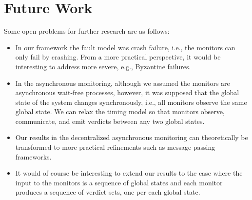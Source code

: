 \section{Future Work}

Some open problems for further research are as follows:

\begin{itemize}

\item In our framework the fault model was crash failure, i.e., the monitors can only fail by crashing. From a more practical perspective, it would be interesting to address more severe, e.g., Byzantine failures.

\item In the asynchronous monitoring, although we assumed the monitors are 
asynchronous wait-free processes, however, it was supposed that the global state 
of the system changes synchronously, i.e., all monitors observe the same 
global state. We can relax the timing model so that monitors observe, 
communicate, and emit verdicts between any two global states. 

\item Our results in the decentralized asynchronous monitoring can 
theoretically be transformed to more practical refinements such as message 
passing frameworks.

\item It would of course be interesting to extend our results to the case where 
the input to the monitors is a sequence of global states and each monitor 
produces a sequence of verdict sets, one per each global state. 

\end{itemize}
